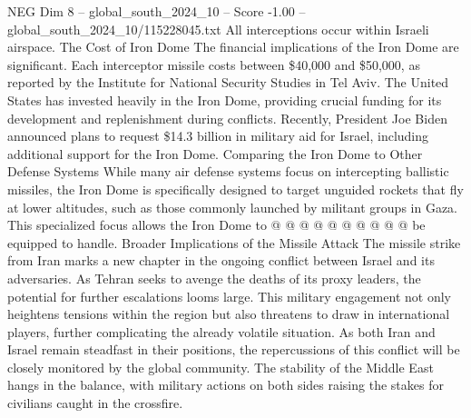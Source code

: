 \begin{textsample}{NEG Dim 8 – global\_south\_2024\_10 – Score -1.00 – global\_south\_2024\_10/115228045.txt}
All interceptions occur within Israeli airspace.
The Cost of Iron Dome The financial implications of the Iron Dome are significant.
Each interceptor missile costs between \$40,000 and \$50,000, as reported by the Institute for National Security Studies in Tel Aviv.
The United States has invested heavily in the Iron Dome, providing crucial funding for its development and replenishment during conflicts.
Recently, President Joe Biden announced plans to request \$14.3 billion in military aid for Israel, including additional support for the Iron Dome.
Comparing the Iron Dome to Other Defense Systems While many air defense systems focus on intercepting ballistic missiles, the Iron Dome is specifically designed to target unguided rockets that fly at lower altitudes, such as those commonly launched by militant groups in Gaza.
This specialized focus allows the Iron Dome to @ @ @ @ @ @ @ @ @ @ be equipped to handle.
Broader Implications of the Missile Attack The missile strike from Iran marks a new chapter in the ongoing conflict between Israel and its adversaries.
As Tehran seeks to avenge the deaths of its proxy leaders, the potential for further escalations looms large.
This military engagement not only heightens tensions within the region but also threatens to draw in international players, further complicating the already volatile situation.
As both Iran and Israel remain steadfast in their positions, the repercussions of this conflict will be closely monitored by the global community.
The stability of the Middle East hangs in the balance, with military actions on both sides raising the stakes for civilians caught in the crossfire.

\end{textsample}

